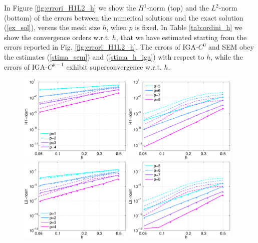 \documentclass[11pt]{article}
\begin{document}
In Figure \ref{fig:errori_H1L2_h} we show the $H^1$-norm (top) and the
$L^2$-norm (bottom) of the errors between the
numerical solutions  and the exact solution
(\ref{ex_sol}), versus the mesh size $h$, when $p$ is fixed. In 
Table \ref{tab:ordini_h} we show the convergence orders w.r.t. $h$, that we have
estimated starting from the errors reported in Fig. \ref{fig:errori_H1L2_h}.
The errors of IGA-$C^0$ and SEM obey the estimates (\ref{stima_sem}) and (\ref{stima_h_iga})
with respect to $h$, while the errors of IGA-$C^{p-1}$ exhibit
superconvergence w.r.t. $h$.


\begin{figure}
\includegraphics[width=0.48\textwidth]{Images/errH1_3d_ha.eps}
\includegraphics[width=0.48\textwidth]{Images/errH1_3d_hb.eps}\\
\includegraphics[width=0.48\textwidth]{Images/errL2_3d_ha.eps}
\includegraphics[width=0.48\textwidth]{Images/errL2_3d_hb.eps}\\

\end{figure}
\end{document}
